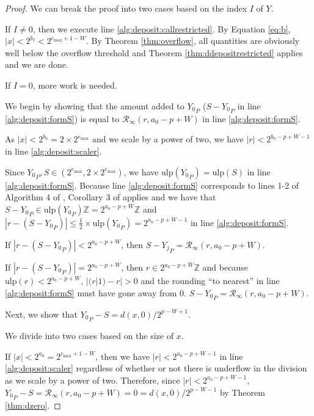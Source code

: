 \documentclass[12pt]{article}
\providecommand{\Z}{\ensuremath{\mathbb{Z}}}
\providecommand{\max}{\ensuremath{\text{max}}}
\providecommand{\ulp}{\ensuremath{\text{ulp}}}
\providecommand{\roundtonearestinfty}{\ensuremath{\mathcal{R}_\text{$\infty$}}}
\theoremstyle{definition}
\numberwithin{equation}{section}
\begin{document}
      \begin{proof}
        We can break the proof into two cases based on the index $I$ of $Y$.

        If $I \neq 0$, then we execute line \ref{alg:deposit:callrestricted}. By Equation \ref{eq:b}, $|x| < 2^{b_I} < 2^{e_{\max} + 1 - W}$. By Theorem \ref{thm:overflow}, all quantities are obviously well below the overflow threshold and Theorem \ref{thm:ddepositrestricted} applies and we are done.

        If $I = 0$, more work is needed.

        We begin by showing that the amount added to ${Y_0}_P$ ($S - {Y_0}_P$ in line \ref{alg:deposit:formS}) is equal to $\roundtonearestinfty(r, a_0 - p + W)$ in line \ref{alg:deposit:formS}.

        As $|x| < 2^{b_0} = 2 \times 2^{e_{\max}}$ and we scale by a power of two, we have $|r| < 2^{b_0 - p + W - 1}$ in line \ref{alg:deposit:scaler}.

        Since ${Y_0}_P, S \in (2^{e_{\max}}, 2 \times 2^{e_{\max}})$, we have $\ulp({Y_0}_P) = \ulp(S)$ in line \ref{alg:deposit:formS}. Because line \ref{alg:deposit:formS} corresponds to lines 1-2 of Algorithm 4 of \cite{repsum}, Corollary 3 of \cite{repsum} applies and we have that $S - {Y_0}_P \in \ulp({Y_0}_P)\Z = 2^{a_0 - p + W}\Z$ and $|r - (S - {Y_0}_P)| \leq \frac{1}{2} \times \ulp({Y_0}_P) = 2^{a_0 - p + W - 1}$ in line \ref{alg:deposit:formS}.

        If $|r - (S - {Y_0}_P)| < 2^{a_{0} - p + W}$, then $S - {Y_j}_P = \roundtonearestinfty(r, a_{0} - p + W)$.

        If $|r - (S - {Y_0}_P)| = 2^{a_{0} - p + W}$, then $r \in 2^{a_0 - p + W}\Z$ and because $\ulp(r) < 2^{a_{0} - p + W}$, $|(r | 1) - r| > 0$ and the rounding ``to nearest'' in line \ref{alg:deposit:formS} must have gone away from 0. $S - {Y_0}_P = \roundtonearestinfty(r, a_0 - p + W)$.

        Next, we show that ${Y_0}_P - S = d(x, 0)/2^{p - W + 1}$.

        We divide into two cases based on the size of $x$.

        If $|x| < 2^{a_0} = 2^{e_{\max} + 1 - W}$, then we have $|r| < 2^{a_0 - p + W - 1}$ in line \ref{alg:deposit:scaler} regardless of whether or not there is underflow in the division as we scale by a power of two.
         Therefore, since $|r| < 2^{a_0 - p + W - 1}$, ${Y_0}_P - S = \roundtonearestinfty(r, a_0 - p + W) = 0 = d(x, 0)/2^{p - W - 1}$ by Theorem \ref{thm:dzero}.


\end{proof}
\end{document}
